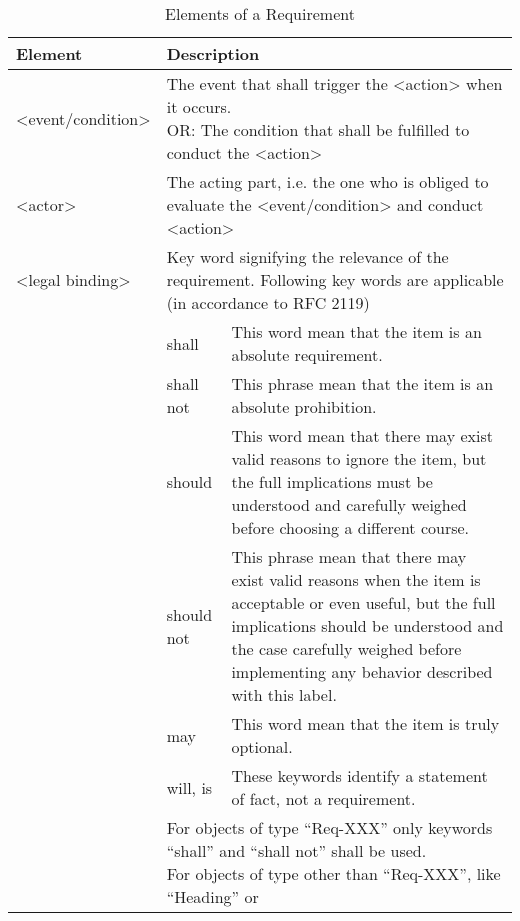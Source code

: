 	\begin{table}[h]
		\renewcommand{\arraystretch}{1.3}
		\centering
		\caption{Elements of a Requirement}
		\begin{tabular}{|p{2.5cm}|p{2cm}|p{6cm}|}  
			\specialrule{0.2em}{0pt}{0pt} 
			\centering \cellcolor{mygray} \textbf{Element}  & \multicolumn{2}{l|}{\cellcolor{mygray} \textbf{Description}}  \\    
			\hline
			\textcolor{winered}{<event/condition>}  & \multicolumn{2}{p{8cm}|}{The event that shall trigger the \textcolor{mygreen1}{<action>} when it occurs. \newline OR: The condition that shall be fulfilled to conduct the \textcolor{mygreen1}{<action>}} \\
			\hline
			\textcolor{mybule}{<actor>}  & \multicolumn{2}{p{8cm}|}{The acting part, i.e. the one who is obliged to evaluate the \textcolor{winered}{<event/condition>} and conduct \textcolor{mygreen1}{<action>}} \\
			\hline
			\textcolor{mypurple}{<legal binding>}   &  \multicolumn{2}{p{8cm}|}{Key word signifying the relevance of the requirement. Following key words are applicable (in accordance to RFC 2119)} \\
			\cline{2-3}
						&shall       & This word mean that the item is an absolute requirement. \\
						&shall not   & This phrase mean that the item is an absolute prohibition.\\
						&should      &This word mean that there may exist valid reasons to ignore
						the item, but the full implications must be understood and
						carefully weighed before choosing a different course.\\
						&should not           &This phrase mean that there may exist valid reasons
						when the item is acceptable or even useful, but the full
						implications should be understood and the case carefully
						weighed before implementing any behavior described with
						this label.\\
						&may          &This word mean that the item is truly optional.\\
						&will, is           &These keywords identify a statement of fact, not a
						requirement.\\
			\cline{2-3}
						&    \multicolumn{2}{p{8cm}|}{For objects of type “Req-XXX” only keywords “shall” and “shall not” shall
						be used.\newline
						For objects of type other than “Req-XXX”, like “Heading” or
}
\end{tabular}
\end{table}
